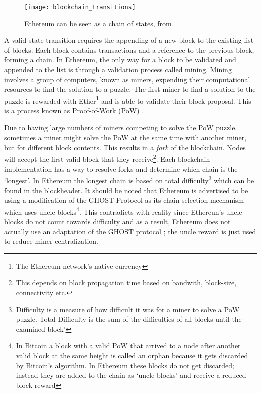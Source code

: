 \begin{figure}[H]
    \centering
    \texttt{[image: blockchain\_transitions]}
    \caption{Ethereum can be seen as a chain of states, from \cite{visual}}
    \label{fig:worldstate_update}
\end{figure}

A valid state transition requires the appending of a new block to the existing list of blocks. Each block contains transactions and a reference to the previous block, forming a chain. In Ethereum, the only way for a block to be validated and appended to the list is through a validation process called mining. Mining involves a group of computers, known as miners, expending their computational resources to find the solution to a puzzle. The first miner to find a solution to the puzzle is rewarded with Ether\footnote{The Ethereum network's native currency} and is able to validate their block proposal. This is a process known as Proof-of-Work (PoW) \cite{pow}. 

Due to having large numbers of miners competing to solve the PoW puzzle, sometimes a miner might solve the PoW at the same time with another miner, but for different block contents. This results in a \textit{fork} of the blockchain. Nodes will accept the first valid block that they receive\footnote{This depends on block propagation time based on bandwith, block-size, connectivity etc.}. Each blockchain implementation has a way to resolve forks and determine which chain is the `longest'. In Ethereum the longest chain is based on total difficulty\footnote{Difficulty is a measure of how difficult it was for a miner to solve a PoW puzzle. Total Difficulty is the sum of the difficulties of all blocks until the examined block'} which can be found in the blockheader. It should be noted that Ethereum is advertised to be using a modification of the GHOST Protocol\cite{GHOST} as its chain selection mechanism which uses uncle blocks\footnote{In Bitcoin a block with a valid PoW that arrived to a node after another valid block at the same height is called an orphan because it gets discarded by Bitcoin's algorithm. In Ethereum these blocks do not get discarded; instead they are added to the chain as `uncle blocks' and receive a reduced block reward}. This contradicts with reality since Ethereun's uncle blocks do not count towards difficulty and as a result, Ethereum does not actually use an adaptation of the GHOST protocol \cite{Gervais:2016:SPP:2976749.2978341}; the uncle reward is just used to reduce miner centralization.

